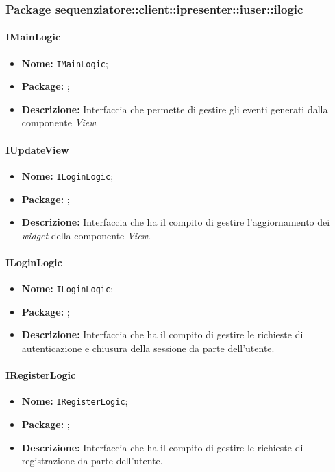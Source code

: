 \subsubsection{Package sequenziatore::client::ipresenter::iuser::ilogic}

\paragraph{IMainLogic}
\begin{itemize}
\item \textbf{Nome:} \texttt{IMainLogic};
\item \textbf{Package:} \texttt{\iLogicUser{}};
\item \textbf{Descrizione:} Interfaccia che permette di gestire gli eventi generati dalla componente \textit{View}.
\end{itemize}

\paragraph{IUpdateView}
\begin{itemize}
\item \textbf{Nome:} \texttt{ILoginLogic};
\item \textbf{Package:} \texttt{\iLogicUser{}};
\item \textbf{Descrizione:} Interfaccia che ha il compito di gestire l'aggiornamento dei \textit{widget} della componente \textit{View}.
\end{itemize}

\paragraph{ILoginLogic}
\begin{itemize}
\item \textbf{Nome:} \texttt{ILoginLogic};
\item \textbf{Package:} \texttt{\iLogicUser{}};
\item \textbf{Descrizione:} Interfaccia che ha il compito di gestire le richieste di autenticazione e chiusura della sessione da parte dell'utente.
\end{itemize}

\paragraph{IRegisterLogic}
\begin{itemize}
\item \textbf{Nome:} \texttt{IRegisterLogic};
\item \textbf{Package:} \texttt{\iLogicUser{}};
\item \textbf{Descrizione:} Interfaccia che ha il compito di gestire le richieste di registrazione da parte dell'utente.
\end{itemize}

